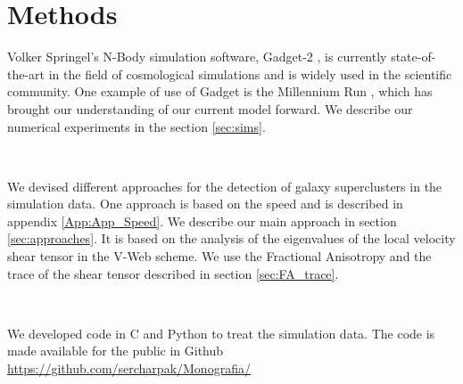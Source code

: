 \documentclass[12pt]{article}
\begin{document}
\section{Methods}
\begin{par}
Volker Springel's N-Body simulation software,
 Gadget-2 \cite{springel_gadget_2_2005}, is
  currently state-of-the-art in the field of
   cosmological simulations and is widely used in
    the scientific community. One example of use of
     Gadget is the Millennium Run
      \cite{springel_simulations_2005}, which has
       brought our understanding of our current
        model forward. We describe our numerical
         experiments in the section \ref{sec:sims}.
\end{par}
\\
\begin{par}
We devised different approaches for the detection of
 galaxy superclusters in the simulation data. One
  approach is based on the speed and is described in
   appendix \ref{App:App_Speed}. We describe our
    main approach in section \ref{sec:approaches}.
     It is based on the analysis of the 
    eigenvalues of the local velocity shear tensor
     in the V-Web scheme. We use the Fractional
      Anisotropy and the trace of the shear tensor
       described in section \ref{sec:FA_trace}. 
\end{par}
\\
\begin{par}
We developed code in C and Python to treat the
 simulation data. The code is made available for the
  public in Github
   \url{https://github.com/sercharpak/Monografia/}
\end{par}
\end{document}
